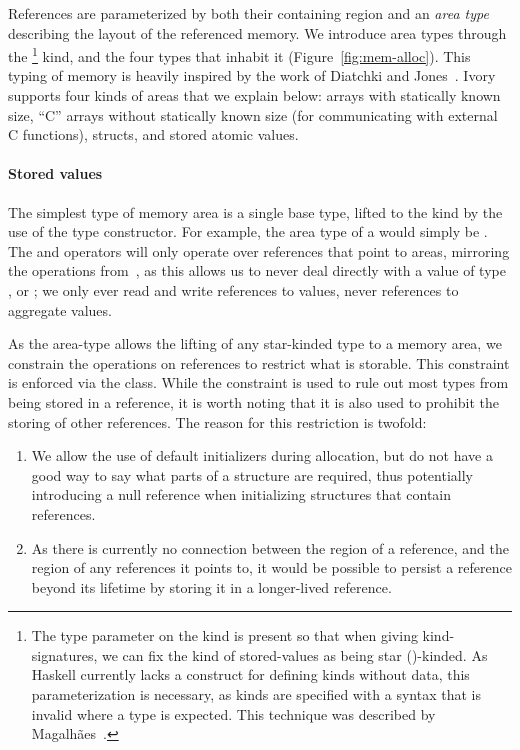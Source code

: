 References are parameterized by both their containing region
and an \emph{area type} describing the layout of the referenced memory.  We
introduce area types through the \footnote{The type parameter on the
 kind is present so that when giving kind-signatures, we can fix the
kind of stored-values as being star (\cd{*})-kinded.  As Haskell currently lacks
a construct for defining kinds without data, this parameterization is necessary,
as kinds are specified with a syntax that is invalid where a type is expected.
This technique was described by Magalh\~{a}es~\cite{jpm:trkgp:12}.} kind, and
the four types that inhabit it (Figure~\ref{fig:mem-alloc}).  This typing of
memory is heavily inspired by the work of Diatchki and Jones~\cite{memareas}.
Ivory supports four kinds of areas that we explain below: arrays with statically
known size, ``C'' arrays without statically known size (for communicating with
external C functions), structs, and stored atomic values.

\paragraph{Stored values}
The simplest type of memory area is a single base type, lifted to the 
kind by the use of the  type constructor.  For example, the area type
of a  would simply be . The  and
 operators will only operate over references that point to  areas,
mirroring the operations from~\cite{memareas}, as this allows us to never deal
directly with a value of type , or ; we only ever read and
write references to values, never references to aggregate values.

As the  area-type allows the lifting of any star-kinded type to a
memory area, we constrain the operations on references to restrict what is
storable.  This constraint is enforced via the  class.  While the
 constraint is used to rule out most types from being stored in a
reference, it is worth noting that it is also used to prohibit the storing of other
references.  The reason for this restriction is twofold:

\begin{enumerate}
\item We allow the use of default initializers during allocation, but do not have
  a good way to say what parts of a structure are required, thus potentially
  introducing a null reference when initializing structures that contain
  references.
\item As there is currently no connection between the region of a reference, and
  the region of any references it points to, it would be possible to persist a
  reference beyond its lifetime by storing it in a longer-lived reference.
\end{enumerate}

